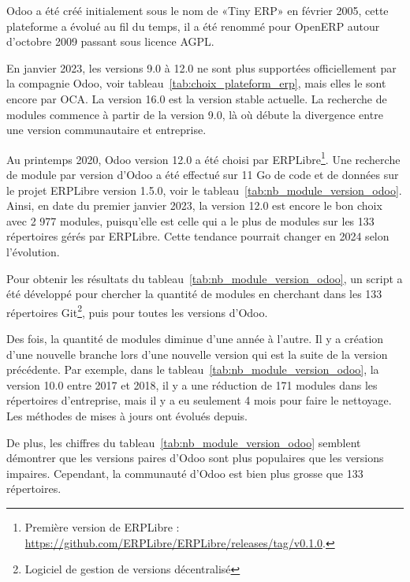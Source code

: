 
Odoo a été créé initialement sous le nom de «Tiny ERP» en février 2005, cette plateforme a évolué au fil du temps, il a été renommé pour OpenERP autour d'octobre 2009 passant sous licence AGPL.

En janvier 2023, les versions 9.0 à 12.0 ne sont plus supportées officiellement par la compagnie Odoo, voir tableau~\ref{tab:choix_plateform_erp}, mais elles le sont encore par OCA. La version 16.0 est la version stable actuelle. La recherche de modules commence à partir de la version 9.0, là où débute la divergence entre une version communautaire et entreprise.

Au printemps 2020, Odoo version 12.0 a été choisi par ERPLibre\footnote{Première version de ERPLibre : \url{https://github.com/ERPLibre/ERPLibre/releases/tag/v0.1.0}.}. Une recherche de module par version d'Odoo a été effectué sur 11 Go de code et de données sur le projet ERPLibre version 1.5.0, voir le tableau~\ref{tab:nb_module_version_odoo}. Ainsi, en date du premier janvier 2023, la version 12.0 est encore le bon choix avec 2 977 modules, puisqu'elle est celle qui a le plus de modules sur les 133 répertoires gérés par ERPLibre. Cette tendance pourrait changer en 2024 selon l’évolution.

Pour obtenir les résultats du tableau~\ref{tab:nb_module_version_odoo}, un script a été développé pour chercher la quantité de modules en cherchant dans les 133 répertoires Git\footnote{Logiciel de gestion de versions décentralisé}, puis pour toutes les versions d'Odoo.

Des fois, la quantité de modules diminue d'une année à l'autre. Il y a création d'une nouvelle branche lors d'une nouvelle version qui est la suite de la version précédente. Par exemple, dans le tableau~\ref{tab:nb_module_version_odoo}, la version 10.0 entre 2017 et 2018, il y a une réduction de 171 modules dans les répertoires d'entreprise, mais il y a eu seulement 4 mois pour faire le nettoyage. Les méthodes de mises à jours ont évolués depuis.

De plus, les chiffres du tableau~\ref{tab:nb_module_version_odoo} semblent démontrer que les versions paires d'Odoo sont plus populaires que les versions impaires. Cependant, la communauté d'Odoo est bien plus grosse que 133 répertoires.

